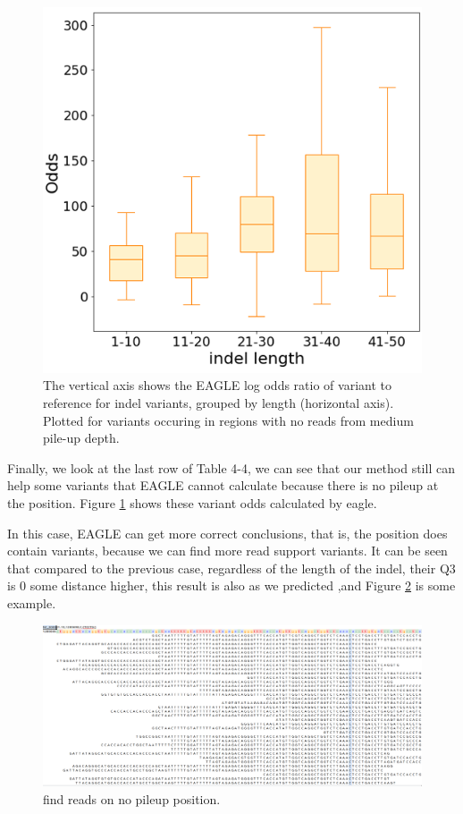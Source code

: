 \vspace{0.5cm}
\begin{figure}[H]
    \centering
    \includegraphics[width=0.6\columnwidth]{body/image/4-11.png}
    \captionsetup{labelfont=bf}
    \renewcommand{\baselinestretch}{1.0}
    \caption[no reads with variants from medium pile-up depth odds ratio]{The vertical axis shows the EAGLE log odds ratio of variant to reference for indel variants, grouped by length (horizontal axis).  Plotted for variants occuring in regions with no reads from medium pile-up depth.}
    \label{f4-11}
\end{figure}


Finally, we look at the last row of Table 4-4, we can see that our method still can help some variants that EAGLE cannot calculate because there is no pileup at the position. Figure \ref{f4-11} shows these variant odds calculated by eagle.

In this case, EAGLE can get more correct conclusions, that is, the position does contain variants, because we can find more read support variants. It can be seen that compared to the previous case, regardless of the length of the indel, their Q3 is 0 some distance higher, this result is also as we predicted ,and Figure \ref{f4-12} is some example.

\vspace{1cm}
\begin{figure}[H]
    \centering
    \includegraphics[width=1\columnwidth]{body/image/4-12.png}
    \captionsetup{labelfont=bf}
    \renewcommand{\baselinestretch}{1.0}
    \vspace{-1cm}
    \caption[find new pileup reads in medium pile-up read depth]{find reads on no pileup position.}
    \label{f4-12}
\end{figure}


